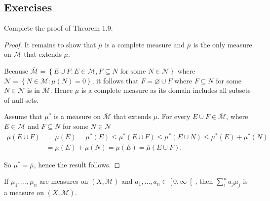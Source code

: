 \subsection*{Exercises}

\begin{exercise}
    Complete the proof of Theorem 1.9.
\end{exercise}

\begin{proof}
    It remains to show that \( \overline{\mu} \) is a complete measure and \( \overline{\mu} \) is the only measure on \( \overline{\mathcal{M}} \) that extends \( \mu \).

    Because \( \overline{\mathcal{M}} = \left\{ E \cup F : E \in \mathcal{M}, F \subseteq N \text{ for some } N \in \mathcal{N} \right\} \) where \( \mathcal{N} = \left\{ N \in \mathcal{M} : \mu(N) = 0 \right\} \), it follows that \( F = \varnothing \cup F \) where \( F \subseteq N \) for some \( N \in \mathcal{N} \) is in \( \overline{\mathcal{M}} \). Hence \( \overline{\mu} \) is a complete measure as its domain includes all subsets of null sets.

    Assume that \( \mu^{\ast} \) is a measure on \( \overline{\mathcal{M}} \) that extends \( \mu \). For every \( E \cup F \in \overline{\mathcal{M}} \), where \( E \in \mathcal{M} \) and \( F \subseteq N \) for some \( N \in \mathcal{N} \)
    \begingroup
    \allowdisplaybreaks%
    \begin{align*}
        \overline{\mu}(E \cup F) & = \mu(E) = \mu^{\ast}(E) \le \mu^{\ast}(E \cup F) \le \mu^{\ast}(E \cup N) \le \mu^{\ast}(E) + \mu^{\ast}(N) \\
                                 & = \mu(E) + \mu(N) = \mu(E) = \overline{\mu}(E \cup F).
    \end{align*}
    \endgroup

    So \( \mu^{\ast} = \overline{\mu} \), hence the result follows.
\end{proof}

\newpage

\begin{exercise}
    If \( \mu_{1}, \ldots, \mu_{n} \) are measures on \( (X, \mathcal{M}) \) and \( a_{1}, \ldots, a_{n} \in \left\lbrack 0, \infty \right\lbrack \), then \( \sum_{1}^{n} a_{j}\mu_{j} \) is a measure on \( (X, \mathcal{M}) \).
\end{exercise}


